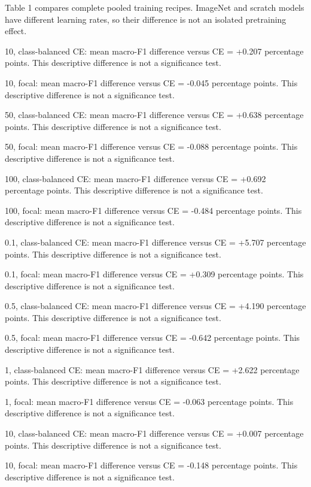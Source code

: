 Table 1 compares complete pooled training recipes. ImageNet and scratch models have different learning rates, so their difference is not an isolated pretraining effect.

10, class-balanced CE: mean macro-F1 difference versus CE = +0.207 percentage points. This descriptive difference is not a significance test.

10, focal: mean macro-F1 difference versus CE = -0.045 percentage points. This descriptive difference is not a significance test.

50, class-balanced CE: mean macro-F1 difference versus CE = +0.638 percentage points. This descriptive difference is not a significance test.

50, focal: mean macro-F1 difference versus CE = -0.088 percentage points. This descriptive difference is not a significance test.

100, class-balanced CE: mean macro-F1 difference versus CE = +0.692 percentage points. This descriptive difference is not a significance test.

100, focal: mean macro-F1 difference versus CE = -0.484 percentage points. This descriptive difference is not a significance test.

0.1, class-balanced CE: mean macro-F1 difference versus CE = +5.707 percentage points. This descriptive difference is not a significance test.

0.1, focal: mean macro-F1 difference versus CE = +0.309 percentage points. This descriptive difference is not a significance test.

0.5, class-balanced CE: mean macro-F1 difference versus CE = +4.190 percentage points. This descriptive difference is not a significance test.

0.5, focal: mean macro-F1 difference versus CE = -0.642 percentage points. This descriptive difference is not a significance test.

1, class-balanced CE: mean macro-F1 difference versus CE = +2.622 percentage points. This descriptive difference is not a significance test.

1, focal: mean macro-F1 difference versus CE = -0.063 percentage points. This descriptive difference is not a significance test.

10, class-balanced CE: mean macro-F1 difference versus CE = +0.007 percentage points. This descriptive difference is not a significance test.

10, focal: mean macro-F1 difference versus CE = -0.148 percentage points. This descriptive difference is not a significance test.
